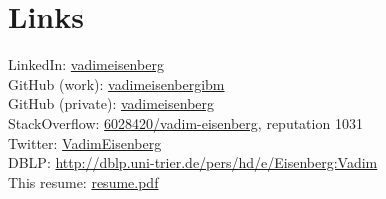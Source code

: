 \documentclass[]{deedy-resume}
\begin{document}
\begin{minipage}[t]{0.66\textwidth}
\section{Links}
LinkedIn:  \href{https://www.linkedin.com/in/vadimeisenberg}{vadimeisenberg} \\
GitHub (work): \href{https://github.com/vadimeisenbergibm}{vadimeisenbergibm} \\
GitHub (private): \href{https://github.com/vadimeisenberg}{vadimeisenberg} \\
StackOverflow: \href{http://stackoverflow.com/users/6028420/vadim-eisenberg}{6028420/vadim-eisenberg}, reputation 1031 \\
Twitter: \href{https://twitter.com/VadimEisenberg}{VadimEisenberg} \\
DBLP: \href{http://dblp.uni-trier.de/pers/hd/e/Eisenberg:Vadim}{http://dblp.uni-trier.de/pers/hd/e/Eisenberg:Vadim} \\
This resume: \href{https://github.com/VadimEisenberg/resume/raw/gh-pages/resume.pdf}{resume.pdf}

%
%




\end{minipage}
\end{document}
